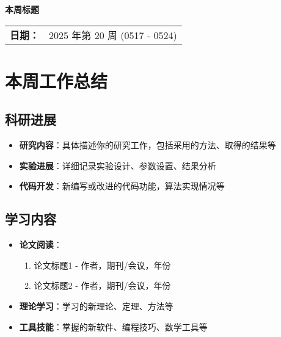 \documentclass[12pt,a4paper]{article}
\begin{document}
\begin{center}
    \vspace*{1cm}
        {\Large\bfseries 本周标题 }\\[1cm]
    
    \begin{tabular}{ll}
        \textbf{日期：} & 2025 年第 20 周 (0517 - 0524) \\[0.3cm]
    \end{tabular}
\end{center}


\section{本周工作总结}

\subsection{科研进展}
\begin{itemize}
    \item \textbf{研究内容}：具体描述你的研究工作，包括采用的方法、取得的结果等
    \item \textbf{实验进展}：详细记录实验设计、参数设置、结果分析
    \item \textbf{代码开发}：新编写或改进的代码功能，算法实现情况等
\end{itemize}

\subsection{学习内容}
\begin{itemize}
    \item \textbf{论文阅读}：
    \begin{enumerate}
        \item 论文标题1 - 作者，期刊/会议，年份
        \item 论文标题2 - 作者，期刊/会议，年份
    \end{enumerate}
    \item \textbf{理论学习}：学习的新理论、定理、方法等
    \item \textbf{工具技能}：掌握的新软件、编程技巧、数学工具等
\end{itemize}
\end{document}
